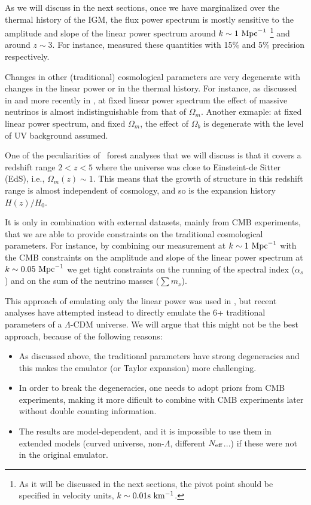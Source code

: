 As we will discuss in the next sections, once we have marginalized over 
the thermal history of the IGM, the flux power spectrum is mostly 
sensitive to the amplitude and slope of the linear power spectrum around 
$k \sim 1 \ \text{Mpc}^{-1}$ 
\footnote{As it will be discussed in the next sections, the pivot point 
should be specified in velocity units, $k \sim 0.01 {\rm s~km^{-1}}$.} 
and around $z \sim 3$.
For instance, \cite{McDonald2005a} measured these quantities with 15\% and 
5\% precision respectively.

Changes in other (traditional) cosmological parameters are very degenerate 
with changes in the linear power or in the thermal history. 
For instance, as discussed in \cite{Viel2010} and more recently in 
\cite{Pedersen2018}, at fixed linear power spectrum the effect of massive 
neutrinos is almost indistinguishable from that of $\Omega_m$. 
Another exmaple: at fixed linear power spectrum, and fixed $\Omega_m$, the 
effect of $\Omega_b$ is degenerate with the level of UV background assumed.

One of the peculiarities of \lya\ forest analyses that we will discuss is 
that it covers a redshift range $2 < z < 5$ where the universe was close 
to Einsteint-de Sitter (EdS), i.e., $\Omega_m(z) \sim 1$. 
This means that the growth of structure in this redshift range is almost  
independent of cosmology, and so is the expansion history $H(z)/H_0$.

It is only in combination with external datasets, mainly from CMB experiments,
that we are able to provide constraints on the traditional cosmological 
parameters. 
For instance, by combining our measurement at $k \sim 1 \ \text{Mpc}^{-1}$ with the CMB 
constraints on the amplitude and slope of the linear power spectrum at 
$k \sim 0.05 \ \text{Mpc}^{-1}$ we get tight constraints on the running of the spectral
index ($\alpha_s$) and on the sum of the neutrino masses ($\sum m_\nu$). 

This approach of emulating only the linear power was used in 
\cite{McDonald2005a}, but recent analyses 
\cite{Palanque-Delabrouille2015,Yeche2017} have attempted instead to 
directly emulate the 6+ traditional parameters of a $\Lambda$-CDM universe. 
We will argue that this might not be the best approach, because of the
following reasons:
\begin{itemize}
 \item As discussed above, the traditional parameters have strong degeneracies
  and this makes the emulator (or Taylor expansion) more challenging. 
 \item In order to break the degeneracies, one needs to adopt priors from 
  CMB experiments, making it more dificult to combine with CMB experiments 
  later without double counting information.
 \item The results are model-dependent, and it is impossible to use them in 
  extended models (curved universe, non-$\Lambda$, different $N_{\rm eff}$...)
  if these were not in the original emulator.
\end{itemize}


